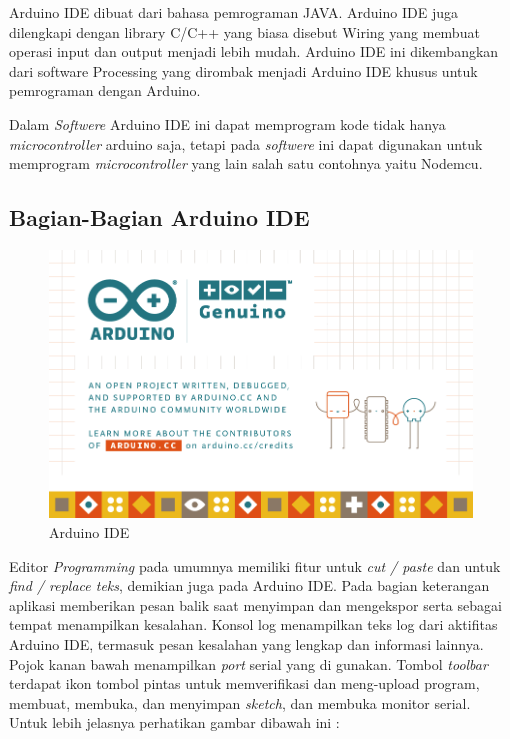 Arduino IDE dibuat dari bahasa pemrograman JAVA. Arduino IDE juga dilengkapi dengan library C/C++ yang biasa disebut Wiring yang membuat operasi input dan output menjadi lebih mudah. Arduino IDE ini dikembangkan dari software Processing yang dirombak menjadi Arduino IDE khusus untuk pemrograman dengan Arduino.

Dalam \textit{Softwere} Arduino IDE ini dapat memprogram kode tidak hanya \textit{microcontroller} arduino saja, tetapi pada \textit{softwere} ini dapat digunakan untuk memprogram \textit{microcontroller} yang lain salah satu contohnya yaitu Nodemcu.

\subsection{Bagian-Bagian Arduino IDE}

\begin{figure}[H]
\centering
\includegraphics[width=1\textwidth]{figures/ide.png}
\caption{Arduino IDE}
\label{print}
\end{figure}
Editor \textit{Programming} pada umumnya memiliki fitur untuk \textit{cut / paste} dan untuk \textit{find / replace teks}, demikian juga pada Arduino IDE. Pada bagian keterangan aplikasi memberikan pesan balik saat menyimpan dan mengekspor serta sebagai tempat menampilkan kesalahan. Konsol log menampilkan teks log dari aktifitas Arduino IDE, termasuk pesan kesalahan yang lengkap dan informasi lainnya. Pojok kanan bawah menampilkan \textit{port} serial yang di gunakan. Tombol \textit{toolbar} terdapat ikon tombol pintas untuk memverifikasi dan meng-upload program, membuat, membuka, dan menyimpan \textit{sketch}, dan membuka monitor serial. Untuk lebih jelasnya perhatikan gambar dibawah ini :


